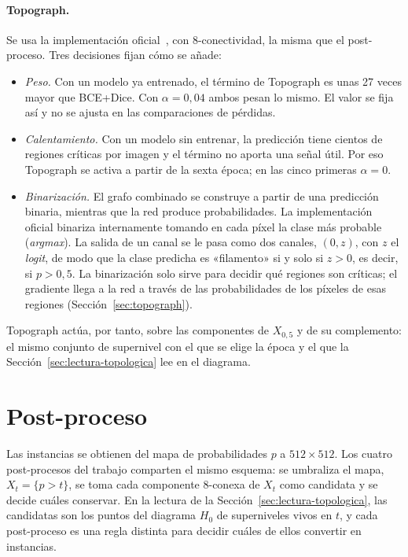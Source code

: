 \paragraph{Topograph.} Se usa la implementación oficial~\cite{lux2025},
con 8-conectividad, la misma que el post-proceso. Tres decisiones fijan
cómo se añade:
\begin{itemize}
  \item \emph{Peso.} Con un modelo ya entrenado, el término de
  Topograph es unas 27 veces mayor que BCE+Dice. Con $\alpha=0{,}04$
  ambos pesan lo mismo. El valor se fija así y no se ajusta en las
  comparaciones de pérdidas.
  \item \emph{Calentamiento.} Con un modelo sin entrenar, la predicción
  tiene cientos de regiones críticas por imagen y el término no aporta
  una señal útil. Por eso Topograph se activa a partir de la sexta
  época; en las cinco primeras $\alpha=0$.
  \item \emph{Binarización.} El grafo combinado se construye a partir de
  una predicción binaria, mientras que la red produce probabilidades. La
  implementación oficial binariza internamente tomando en cada píxel la
  clase más probable (\emph{argmax}). La salida de un canal se le pasa
  como dos canales, $(0, z)$, con $z$ el \emph{logit}, de modo que la
  clase predicha es «filamento» si y solo si $z>0$, es decir, si
  $p>0{,}5$. La binarización solo sirve para decidir qué regiones son
  críticas; el gradiente llega a la red a través de las probabilidades
  de los píxeles de esas regiones (Sección~\ref{sec:topograph}).
\end{itemize}
Topograph actúa, por tanto, sobre las componentes de $X_{0{,}5}$ y de su
complemento: el mismo conjunto de supernivel con el que se elige la
época y el que la Sección~\ref{sec:lectura-topologica} lee en el
diagrama.

\section{Post-proceso}
\label{sec:postproceso}

Las instancias se obtienen del mapa de probabilidades $p$ a
$512\times512$. Los cuatro post-procesos del trabajo comparten el mismo
esquema: se umbraliza el mapa, $X_t=\{p>t\}$, se toma cada componente
8-conexa de $X_t$ como candidata y se decide cuáles conservar. En la
lectura de la Sección~\ref{sec:lectura-topologica}, las candidatas son
los puntos del diagrama $H_0$ de superniveles vivos en $t$, y cada
post-proceso es una regla distinta para decidir cuáles de ellos
convertir en instancias.

